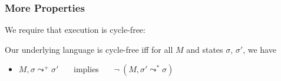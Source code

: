  
 \subsubsection{More Properties}
 

%

We require that execution is cycle-free:
 \begin{definition}
Our underlying language is cycle-free iff for all $M$ and states $\sigma$, $\sigma'$, we have
\begin{itemize}
\item
$ M, \sigma \leadsto^+ \sigma' $ \ \ \ implies \ \ \  $\neg\ (M, \sigma' \leadsto^* \sigma )$
\end{itemize}
\end{definition}

